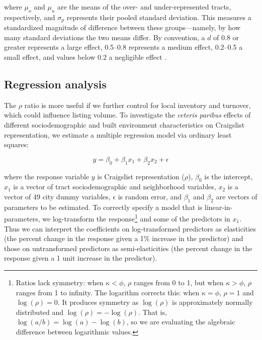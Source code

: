 \documentclass[11pt,onecolumn]{article} %
\begin{document}
where $\mu_o$ and $\mu_u$ are the means of the over- and under-represented tracts, respectively, and $\sigma_p$ represents their pooled standard deviation. This measures a standardized magnitude of difference between these groups---namely, by how many standard deviations the two means differ. By convention, a $d$ of 0.8 or greater represents a large effect, 0.5--0.8 represents a medium effect, 0.2--0.5 a small effect, and values below 0.2 a negligible effect \citep{cohen_power_1992}.





\subsection{Regression analysis}

The $\rho$ ratio is more useful if we further control for local inventory and turnover, which could influence listing volume. To investigate the \textit{ceteris paribus} effects of different sociodemographic and built environment characteristics on Craigslist representation, we estimate a multiple regression model via ordinary least squares:

\begin{equation}
	\label{eq:regression_formula}
	y = \beta_0 + \beta_1 x_1 + \beta_2 x_2 + \epsilon
\end{equation}

where the response variable $y$ is Craigslist representation ($\rho$), $\beta_0$ is the intercept, $x_1$ is a vector of tract sociodemographic and neighborhood variables, $x_2$ is a vector of 49 city dummy variables, $\epsilon$ is random error, and $\beta_1$ and $\beta_2$ are vectors of parameters to be estimated. To correctly specify a model that is linear-in-parameters, we log-transform the response\footnote{Ratios lack symmetry: when $\kappa < \phi$, $\rho$ ranges from 0 to 1, but when  $\kappa > \phi$, $\rho$ ranges from 1 to infinity. The logarithm corrects this: when $\kappa = \phi$, $\rho = 1$ and $\log(\rho) = 0$. It produces symmetry as $\log(\rho)$ is approximately normally distributed and $\log(\rho) = -\log(\rho)$. That is, $\log(a/b) = \log(a)-\log(b)$, so we are evaluating the algebraic difference between logarithmic values.} and some of the predictors in $x_1$. Thus we can interpret the coefficients on log-transformed predictors as elasticities (the percent change in the response given a 1\% increase in the predictor) and those on untransformed predictors as semi-elasticities (the percent change in the response given a 1 unit increase in the predictor).
\end{document}
